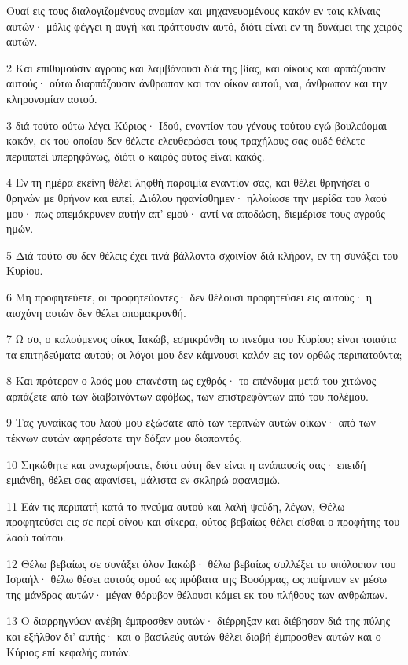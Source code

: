 \par Ουαί εις τους διαλογιζομένους ανομίαν και μηχανευομένους κακόν εν ταις κλίναις αυτών· μόλις φέγγει η αυγή και πράττουσιν αυτό, διότι είναι εν τη δυνάμει της χειρός αυτών.
\par 2 Και επιθυμούσιν αγρούς και λαμβάνουσι διά της βίας, και οίκους και αρπάζουσιν αυτούς· ούτω διαρπάζουσιν άνθρωπον και τον οίκον αυτού, ναι, άνθρωπον και την κληρονομίαν αυτού.
\par 3 διά τούτο ούτω λέγει Κύριος· Ιδού, εναντίον του γένους τούτου εγώ βουλεύομαι κακόν, εκ του οποίου δεν θέλετε ελευθερώσει τους τραχήλους σας ουδέ θέλετε περιπατεί υπερηφάνως, διότι ο καιρός ούτος είναι κακός.
\par 4 Εν τη ημέρα εκείνη θέλει ληφθή παροιμία εναντίον σας, και θέλει θρηνήσει ο θρηνών με θρήνον και ειπεί, Διόλου ηφανίσθημεν· ηλλοίωσε την μερίδα του λαού μου· πως απεμάκρυνεν αυτήν απ' εμού· αντί να αποδώση, διεμέρισε τους αγρούς ημών.
\par 5 Διά τούτο συ δεν θέλεις έχει τινά βάλλοντα σχοινίον διά κλήρον, εν τη συνάξει του Κυρίου.
\par 6 Μη προφητεύετε, οι προφητεύοντες· δεν θέλουσι προφητεύσει εις αυτούς· η αισχύνη αυτών δεν θέλει απομακρυνθή.
\par 7 Ω συ, ο καλούμενος οίκος Ιακώβ, εσμικρύνθη το πνεύμα του Κυρίου; είναι τοιαύτα τα επιτηδεύματα αυτού; οι λόγοι μου δεν κάμνουσι καλόν εις τον ορθώς περιπατούντα;
\par 8 Και πρότερον ο λαός μου επανέστη ως εχθρός· το επένδυμα μετά του χιτώνος αρπάζετε από των διαβαινόντων αφόβως, των επιστρεφόντων από του πολέμου.
\par 9 Τας γυναίκας του λαού μου εξώσατε από των τερπνών αυτών οίκων· από των τέκνων αυτών αφηρέσατε την δόξαν μου διαπαντός.
\par 10 Σηκώθητε και αναχωρήσατε, διότι αύτη δεν είναι η ανάπαυσίς σας· επειδή εμιάνθη, θέλει σας αφανίσει, μάλιστα εν σκληρώ αφανισμώ.
\par 11 Εάν τις περιπατή κατά το πνεύμα αυτού και λαλή ψεύδη, λέγων, Θέλω προφητεύσει εις σε περί οίνου και σίκερα, ούτος βεβαίως θέλει είσθαι ο προφήτης του λαού τούτου.
\par 12 Θέλω βεβαίως σε συνάξει όλον Ιακώβ· θέλω βεβαίως συλλέξει το υπόλοιπον του Ισραήλ· θέλω θέσει αυτούς ομού ως πρόβατα της Βοσόρρας, ως ποίμνιον εν μέσω της μάνδρας αυτών· μέγαν θόρυβον θέλουσι κάμει εκ του πλήθους των ανθρώπων.
\par 13 Ο διαρρηγνύων ανέβη έμπροσθεν αυτών· διέρρηξαν και διέβησαν διά της πύλης και εξήλθον δι' αυτής· και ο βασιλεύς αυτών θέλει διαβή έμπροσθεν αυτών και ο Κύριος επί κεφαλής αυτών.

